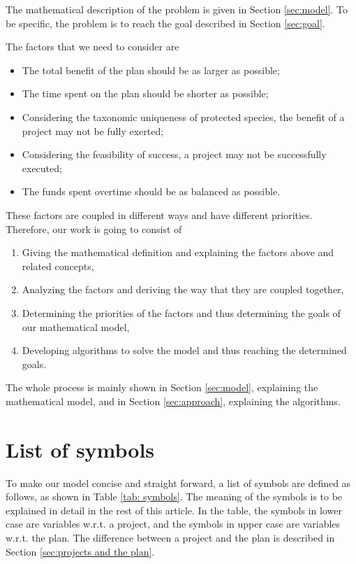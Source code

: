 \documentclass{article}
\begin{document}
The mathematical description of the problem is given in Section \ref{sec:model}.
To be specific, the problem is to reach the goal described in Section \ref{sec:goal}.

The factors that we need to consider are
\begin{itemize}
\item The total benefit of the plan should be as larger as possible;
\item The time spent on the plan should be shorter as possible;
\item Considering the taxonomic uniqueness of protected species, the benefit of a project may not be fully exerted;
\item Considering the feasibility of success, a project may not be successfully executed;
\item The funds spent overtime should be as balanced as possible.
\end{itemize}

These factors are coupled in different ways and have different priorities.
Therefore, our work is going to consist of
\begin{enumerate}
\item Giving the mathematical definition and explaining the factors above and related concepts,
\item Analyzing the factors and deriving the way that they are coupled together,
\item Determining the priorities of the factors and thus determining the goals of our mathematical model,
\item Developing algorithms to solve the model and thus reaching the determined goals.
\end{enumerate}

The whole process is mainly shown in Section \ref{sec:model}, explaining the mathematical model, and in Section \ref{sec:approach}, explaining the algorithms.

\section{List of symbols}

To make our model concise and straight forward, a list of symbols are defined as follows, as shown in Table \ref{tab: symbols}.
The meaning of the symbols is to be explained in detail in the rest of this article.
In the table, the symbols in lower case are variables w.r.t. a project,
and the symbols in upper case are variables w.r.t. the plan.
The difference between a project and the plan is described in Section \ref{sec:projects and the plan}.
\end{document}
